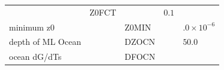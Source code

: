 \begin{longtable}[]{@{}lllll@{}}
\begin{minipage}[t]{0.15\columnwidth}
\strut
\end{minipage} & \begin{minipage}[t]{0.11\columnwidth}\raggedright
Z0FCT\strut
\end{minipage} & \begin{minipage}[t]{0.04\columnwidth}\raggedright
\strut
\end{minipage} & \begin{minipage}[t]{0.37\columnwidth}\raggedright
\(0.1\)\strut
\end{minipage}\tabularnewline
\begin{minipage}[t]{0.19\columnwidth}\raggedright
minimum z0\strut
\end{minipage} & \begin{minipage}[t]{0.15\columnwidth}\raggedright
\strut
\end{minipage} & \begin{minipage}[t]{0.11\columnwidth}\raggedright
Z0MIN\strut
\end{minipage} & \begin{minipage}[t]{0.04\columnwidth}\raggedright
\strut
\end{minipage} & \begin{minipage}[t]{0.37\columnwidth}\raggedright
\(.0\times 10^{-6}\)\strut
\end{minipage}\tabularnewline
\begin{minipage}[t]{0.19\columnwidth}\raggedright
depth of ML Ocean\strut
\end{minipage} & \begin{minipage}[t]{0.15\columnwidth}\raggedright
\strut
\end{minipage} & \begin{minipage}[t]{0.11\columnwidth}\raggedright
DZOCN\strut
\end{minipage} & \begin{minipage}[t]{0.04\columnwidth}\raggedright
\strut
\end{minipage} & \begin{minipage}[t]{0.37\columnwidth}\raggedright
\(50.0\)\strut
\end{minipage}\tabularnewline
\begin{minipage}[t]{0.19\columnwidth}\raggedright
ocean dG/dTs\strut
\end{minipage} & \begin{minipage}[t]{0.15\columnwidth}\raggedright
\strut
\end{minipage} & \begin{minipage}[t]{0.11\columnwidth}\raggedright
DFOCN\strut

\end{minipage}
\end{longtable}
